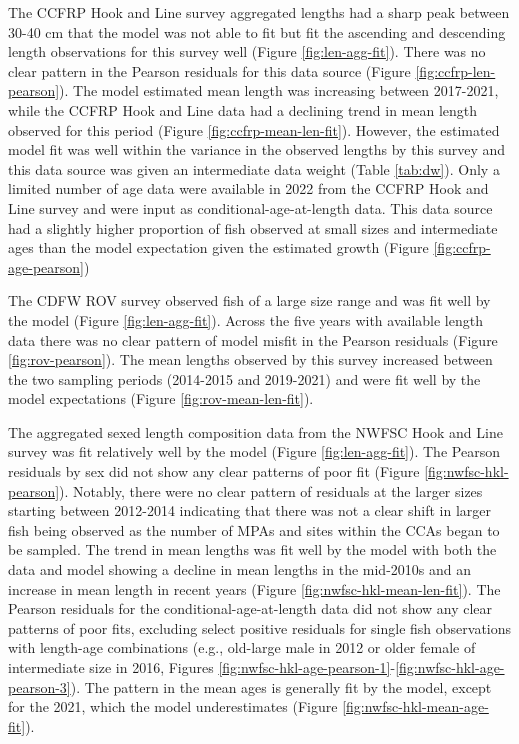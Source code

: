 \documentclass[11pt,
  english,
  letterpaper,
]{article}
\begin{document}
The CCFRP Hook and Line survey aggregated lengths had a sharp peak between 30-40 cm that the model was not able to fit but fit the ascending and descending length observations for this survey well (Figure \ref{fig:len-agg-fit}). There was no clear pattern in the Pearson residuals for this data source (Figure \ref{fig:ccfrp-len-pearson}). The model estimated mean length was increasing between 2017-2021, while the CCFRP Hook and Line data had a declining trend in mean length observed for this period (Figure \ref{fig:ccfrp-mean-len-fit}). However, the estimated model fit was well within the variance in the observed lengths by this survey and this data source was given an intermediate data weight (Table \ref{tab:dw}). Only a limited number of age data were available in 2022 from the CCFRP Hook and Line survey and were input as conditional-age-at-length data. This data source had a slightly higher proportion of fish observed at small sizes and intermediate ages than the model expectation given the estimated growth (Figure \ref{fig:ccfrp-age-pearson})

The CDFW ROV survey observed fish of a large size range and was fit well by the model (Figure \ref{fig:len-agg-fit}). Across the five years with available length data there was no clear pattern of model misfit in the Pearson residuals (Figure \ref{fig:rov-pearson}). The mean lengths observed by this survey increased between the two sampling periods (2014-2015 and 2019-2021) and were fit well by the model expectations (Figure \ref{fig:rov-mean-len-fit}).

The aggregated sexed length composition data from the NWFSC Hook and Line survey was fit relatively well by the model (Figure \ref{fig:len-agg-fit}). The Pearson residuals by sex did not show any clear patterns of poor fit (Figure \ref{fig:nwfsc-hkl-pearson}). Notably, there were no clear pattern of residuals at the larger sizes starting between 2012-2014 indicating that there was not a clear shift in larger fish being observed as the number of MPAs and sites within the CCAs began to be sampled. The trend in mean lengths was fit well by the model with both the data and model showing a decline in mean lengths in the mid-2010s and an increase in mean length in recent years (Figure \ref{fig:nwfsc-hkl-mean-len-fit}). The Pearson residuals for the conditional-age-at-length data did not show any clear patterns of poor fits, excluding select positive residuals for single fish observations with length-age combinations (e.g., old-large male in 2012 or older female of intermediate size in 2016, Figures \ref{fig:nwfsc-hkl-age-pearson-1}-\ref{fig:nwfsc-hkl-age-pearson-3}). The pattern in the mean ages is generally fit by the model, except for the 2021, which the model underestimates (Figure \ref{fig:nwfsc-hkl-mean-age-fit}).
\end{document}
